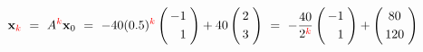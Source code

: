 {\begin{frame}
\begin{itemize}
		\vspace{1mm}
		\[	
		\mathbf{x}_{\color{red}k}		
		\ = \				
		A^{\color{red}k}\mathbf{x}_0
		\ = \
		-40(0.5)^{\color{red}k}
		\left(
		\begin{array}{@{\hspace{0.3\tabcolsep}}r@{\hspace{0.5\tabcolsep}}}
		-1   \\[1mm]
		 1 
		\end{array}
		\right) 
		+
		40 
		\left(
		\begin{array}{@{\hspace{0.3\tabcolsep}}c@{\hspace{0.5\tabcolsep}}}
		2  \\[1mm]
		3 
		\end{array}
		\right) 
		\ = \
		-\frac{40}{2^{\color{red}k}}
		\left(
		\begin{array}{@{\hspace{0.3\tabcolsep}}r@{\hspace{0.5\tabcolsep}}}
		-1   \\[1mm]
		1 
		\end{array}
		\right) 
		+		
		\left(
		\begin{array}{@{\hspace{0.3\tabcolsep}}c@{\hspace{0.5\tabcolsep}}}
		80  \\[1mm]
		120 
		\end{array}
		\right) 
		\]
		
	\end{itemize}
	
\end{frame}
}


\subsection{}

